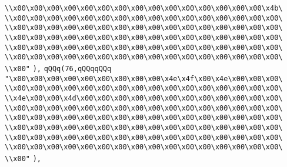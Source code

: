 \verb|\\x00\x00\x00\x00\x00\x00\x00\x00\x00\x00\x00\x00\x00\x00\x00\x4b\|\newline
\verb|\\x00\x00\x00\x00\x00\x00\x00\x00\x00\x00\x00\x00\x00\x00\x00\x00\|\newline
\verb|\\x00\x00\x00\x00\x00\x00\x00\x00\x00\x00\x00\x00\x00\x00\x00\x00\|\newline
\verb|\\x00\x00\x00\x00\x00\x00\x00\x00\x00\x00\x00\x00\x00\x00\x00\x00\|\newline
\verb|\\x00\x00\x00\x00\x00\x00\x00\x00\x00\x00\x00\x00\x00\x00\x00\x00\|\newline
\verb|\\x00\x00\x00\x00\x00\x00\x00\x00\x00\x00\x00\x00\x00\x00\x00\x00\|\newline
\verb|\\x00"|\newline
\verb|),|\newline
\verb|qQQq(76,qQQqqQQq|\newline
\verb|"\x00\x00\x00\x00\x00\x00\x00\x00\x00\x4e\x4f\x00\x4e\x00\x00\x00\|\newline
\verb|\\x00\x00\x00\x00\x00\x00\x00\x00\x00\x00\x00\x00\x00\x00\x00\x00\|\newline
\verb|\\x4e\x00\x00\x4d\x00\x00\x00\x00\x00\x00\x00\x00\x00\x00\x00\x00\|\newline
\verb|\\x00\x00\x00\x00\x00\x00\x00\x00\x00\x00\x00\x00\x00\x00\x00\x00\|\newline
\verb|\\x00\x00\x00\x00\x00\x00\x00\x00\x00\x00\x00\x00\x00\x00\x00\x00\|\newline
\verb|\\x00\x00\x00\x00\x00\x00\x00\x00\x00\x00\x00\x00\x00\x00\x00\x00\|\newline
\verb|\\x00\x00\x00\x00\x00\x00\x00\x00\x00\x00\x00\x00\x00\x00\x00\x00\|\newline
\verb|\\x00\x00\x00\x00\x00\x00\x00\x00\x00\x00\x00\x00\x00\x00\x00\x00\|\newline
\verb|\\x00"|\newline
\verb|),|\newline
